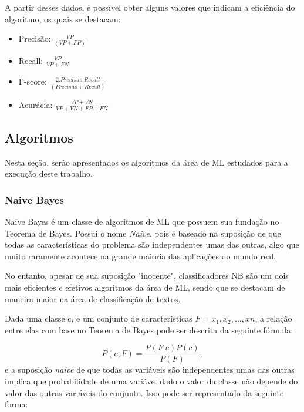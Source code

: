 A partir desses dados, é possível obter alguns valores que indicam a eficiência do algoritmo, os quais se destacam:

\begin{itemize}
    \item Precisão: $\frac{VP}{(VP + FP)}$
    \item Recall: $\frac{VP}{VP + FN}$
    \item F-score: $\frac{2 . Precisao . Recall}{(Precisao + Recall)}$
    \item Acurácia: $\frac{VP + VN}{VP + VN + FP + FN}$
    
\end{itemize}

\subsection{Algoritmos}

Nesta seção, serão apresentados os algoritmos da área de ML estudados para a execução deste trabalho.

\subsubsection{Naive Bayes}

Naive Bayes é um classe de algoritmos de ML que possuem sua fundação no Teorema de Bayes. Possui o nome \textit{Naive}, pois é baseado na suposição de que todas as características do problema são independentes umas das outras, algo que muito raramente acontece na grande maioria das aplicações do mundo real.

No entanto, apesar de sua suposição "inocente", classificadores NB são um dois mais eficientes e efetivos algoritmos da área de ML, sendo que se destacam de maneira maior na área de classificação de textos. \cite{zhang2004optimality}

Dada uma classe c, e um conjunto de características $F = x_{1},x_{2},...,xn$, a relação entre elas com base no Teorema de Bayes pode ser descrita da seguinte fórmula:

\begin{equation}
\label{e.bayes}
P(c,F)=\frac{P(F|c)P(c)}{P(F)},
\end{equation} e a suposição \textit{naive} de que todas as variáveis são independentes umas das outras implica que probabilidade de uma variável dado o valor da classe não depende do valor das outras variáveis do conjunto. Isso pode ser representado da seguinte forma:

